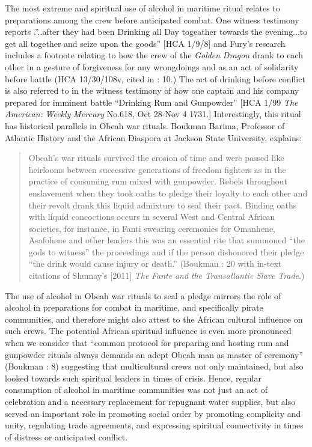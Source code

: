   The most extreme and spiritual use of alcohol in maritime ritual relates to preparations among the crew before anticipated combat. One witness testimony reports .”..after they had been Drinking all Day togeather towards the evening...to get all together and seize upon the goods” [HCA 1/9/8] and Fury’s research includes a footnote relating to how the crew of the \textit{Golden} \textit{Dragon} drank to each other in a gesture of forgiveness for any wrongdoings and as an act of solidarity before battle (HCA 13/30/108v, cited in \citealt{Fury2015}: 10.) The act of drinking before conflict is also referred to in the witness testimony of how one captain and his company prepared for imminent battle “Drinking Rum and Gunpowder” [HCA 1/99 \textit{The} \textit{American:} \textit{Weekly} \textit{Mercury} No.618, Oct 28-Nov 4 1731.] Interestingly, this ritual has historical parallels in Obeah war rituals. Boukman Barima, Professor of Atlantic History and the African Diaspora at Jackson State University, explains:

\begin{quotation}
Obeah’s war rituals survived the erosion of time and were passed like heirlooms between successive generations of freedom fighters as in the practice of consuming rum mixed with gunpowder. Rebels throughout enslavement when they took oaths to pledge their loyalty to each other and their revolt drank this liquid admixture to seal their pact. Binding oaths with liquid concoctions occurs in several West and Central African societies, for instance, in Fanti swearing ceremonies for Omanhene, Asafohene and other leaders this was an essential rite that summoned “the gods to witness” the proceedings and if the person dishonored their pledge “the drink would cause injury or death.” (Boukman \citealt{Barima2016}: 20 with in-text citations of Shumay’s [2011] \textit{The} \textit{Fante} \textit{and} \textit{the} \textit{Transatlantic} \textit{Slave} \textit{Trade}.)\end{quotation}

The use of alcohol in Obeah war rituals to seal a pledge mirrors the role of alcohol in preparations for combat in maritime, and specifically pirate communities, and therefore might also attest to the African cultural influence on such crews. The potential African spiritual influence is even more pronounced when we consider that “common protocol for preparing and hosting rum and gunpowder rituals always demands an adept Obeah man as master of ceremony” (Boukman \citealt{Barima2016}: 8) suggesting that multicultural crews not only maintained, but also looked towards such spiritual leaders in times of crisis. Hence, regular consumption of alcohol in maritime communities was not just an act of celebration and a necessary replacement for repugnant water supplies, but also served an important role in promoting social order by promoting complicity and unity, regulating trade agreements, and expressing spiritual connectivity in times of distress or anticipated conflict. 

